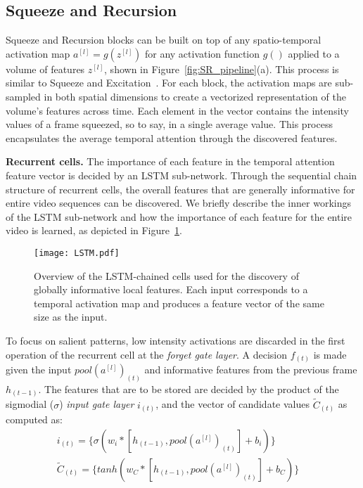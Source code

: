 \documentclass[final,5p,times,twocolumn]{elsarticle}
\begin{document}
\subsection{Squeeze and Recursion}
\label{sec:SR}

Squeeze and Recursion blocks can be built on top of any spatio-temporal activation map $a^{[l]} = g(z^{[l]})$ for any activation function $g()$ applied to a volume of features $z^{[l]}$, shown in Figure~\ref{fig:SR_pipeline}(a). This process is similar to Squeeze and Excitation~\citep{hu2018squeeze}. For each block, the activation maps are sub-sampled in both spatial dimensions to create a vectorized representation of the volume's features across time. Each element in the vector contains the intensity values of a frame squeezed, so to say, in a single average value. This process encapsulates the average temporal attention through the discovered features.



\textbf{Recurrent cells.} The importance of each feature in the temporal attention feature vector is decided by an LSTM sub-network. Through the sequential chain structure of recurrent cells, the overall features that are generally informative for entire video sequences can be discovered. We briefly describe the inner workings of the LSTM sub-network \citep{hochreiter1997long} and how the importance of each feature for the entire video is learned, as depicted in Figure~\ref{fig:LSTM}.

\begin{figure}[!htb]
\centering
\texttt{[image: LSTM.pdf]}
\caption{Overview of the LSTM-chained cells used for the discovery of globally informative local features. Each input corresponds to a temporal activation map and produces a feature vector of the same size as the input.}
\label{fig:LSTM}
\end{figure}

To focus on salient patterns, low intensity activations are discarded in the first operation of the recurrent cell at the \textit{forget gate layer}. A decision $f_{(t)}$ is made given the input $pool(a^{[l]})_{(t)}$ and informative features from the previous frame $h_{(t-1)}$. The features that are to be stored are decided by the product of the sigmodial ($\sigma$) \textit{input gate layer} $i_{(t)}$, and the vector of candidate values $\widetilde{C}_{(t)}$ as computed as:
\vspace{-0.5mm}
\begin{equation}
\label{eq:input_gate}
\begin{split}
    i_{(t)} =\{ \sigma(w_{i} * [h_{(t-1)},pool(a^{[l]})_{(t)}] + b_{i}) \} \quad \quad\\
    \widetilde{C}_{(t)} = \{ tanh(w_{C} * [h_{(t-1)},pool(a^{[l]})_{(t)}] + b_{C}) \} \quad
\end{split}
\end{equation}
\end{document}
